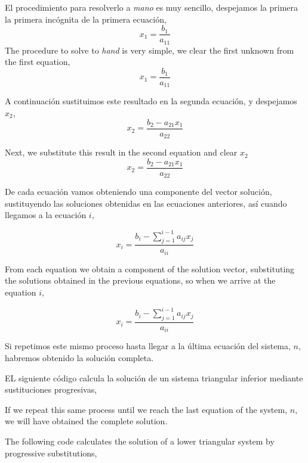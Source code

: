 \begin{paracol}{2}
El procedimiento para resolverlo a \emph{mano} es muy sencillo,
despejamos la primera la primera incógnita de la primera ecuación,
\begin{equation*}
x_1=\frac{b_1}{a_{11}}
\end{equation*}
\switchcolumn  
The procedure to solve to \emph{hand} is very simple,
we clear the first unknown from the first equation,
\begin{equation*}
x_1=\frac{b_1}{a_{11}}
\end{equation*}

\switchcolumn
A continuación sustituimos este resultado en la segunda ecuación, y despejamos $x_2$,
\begin{equation*}
x_2=\frac{b_2-a_{21}x_1}{a_{22}}
\end{equation*}

\switchcolumn
Next, we substitute this result in the second equation and clear $x_2$
\begin{equation*}
x_2=\frac{b_2-a_{21}x_1}{a_{22}}
\end{equation*}

\switchcolumn

De cada ecuación vamos obteniendo una componente del vector solución, sustituyendo las soluciones obtenidas en las ecuaciones anteriores, así cuando llegamos a la ecuación $i$,

\begin{equation*}
x_i=\frac{b_i-\sum_{j=1}^{i-1}a_{ij}x_j}{a_{ii}}
\end{equation*}

\switchcolumn
From each equation we obtain a component of the solution vector, substituting the solutions obtained in the previous equations, so when we arrive at the equation $i$,

\begin{equation*}
x_i=\frac{b_i-\sum_{j=1}^{i-1}a_{ij}x_j}{a_{ii}}
\end{equation*}

\switchcolumn
Si repetimos este mismo proceso hasta llegar a la última ecuación del sistema, $n$, habremos obtenido la solución completa.

EL siguiente código calcula la solución de un sistema triangular inferior mediante sustituciones progresivas,

\switchcolumn

If we repeat this same process until we reach the last equation of the system, $n$, we will have obtained the complete solution.

The following code calculates the solution of a lower triangular system by progressive substitutions,
\end{paracol}

